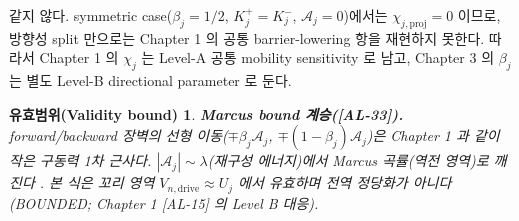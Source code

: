 \documentclass[11pt,a4paper]{article}
\newtheorem*{boundbox}{유효범위(Validity bound)}
\newcommand{\drive}{\mathrm{drive}}
\newcommand{\AL}[1]{\textsf{[AL-#1]}}
\begin{document}
같지 않다. symmetric case($\beta_j=1/2$, $K_j^+=K_j^-$, $\mathcal A_j=0$)에서는 $\chi_{j,\mathrm{proj}}=0$ 이므로,
방향성 split 만으로는 Chapter 1 의 공통 barrier-lowering 항을 재현하지 못한다. 따라서 Chapter 1 의 $\chi_j$ 는
Level-A 공통 mobility sensitivity 로 남고, Chapter 3 의 $\beta_j$ 는 별도 Level-B directional parameter 로 둔다.
\begin{boundbox}
\textbf{Marcus bound 계승(\AL{33}).} forward/backward 장벽의 \emph{선형} 이동($\mp\beta_j\mathcal A_j$,
$\mp(1-\beta_j)\mathcal A_j$)은 Chapter 1 과 같이 작은 구동력 1차 근사다. $|\mathcal A_j|\sim\lambda$(재구성
에너지)에서 Marcus 곡률(역전 영역)로 깨진다 \cite{marcus1956}. 본 식은 꼬리 영역 $V_{n,\drive}\approx U_j$ 에서
유효하며 전역 정당화가 아니다(BOUNDED; Chapter 1 \AL{15} 의 Level B 대응).
\end{boundbox}
\end{document}
